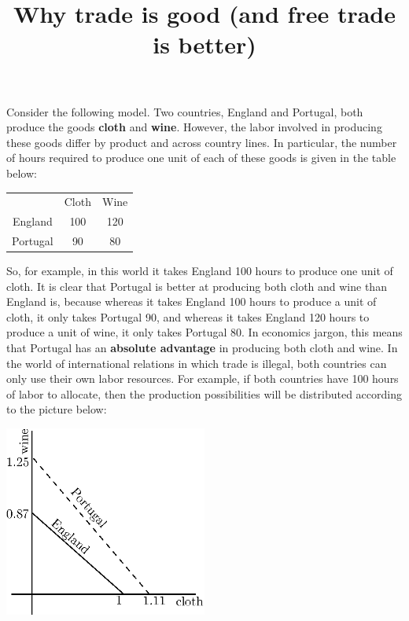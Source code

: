 \documentclass{article}
\title{Why trade is good (and free trade is better)}
\begin{document}
\maketitle

Consider the following model. Two countries, England and Portugal, both produce the goods
\textbf{cloth} and \textbf{wine}. However, the labor involved in producing these goods differ by
product and across country lines. In particular, the number of hours required to produce one unit of
each of these goods is given in the table below:

\begin{center}
  \begin{tabular}[]{ccc}
    & Cloth & Wine \\
    England & 100 & 120 \\
    Portugal & 90 & 80
  \end{tabular}
\end{center}

So, for example, in this world it takes England 100 hours to produce one unit of cloth. It is clear
that Portugal is better at producing both cloth and wine than England is, because whereas it takes
England 100 hours to produce a unit of cloth, it only takes Portugal 90, and whereas it takes
England 120 hours to produce a unit of wine, it only takes Portugal 80. In economics jargon, this
means that Portugal has an \textbf{absolute advantage} in producing both cloth and wine. In the
world of international relations in which trade is illegal, both countries can only use their own
labor resources. For example, if both countries have 100 hours of labor to allocate, then the
production possibilities will be distributed according to the picture below:

\begin{center}
  \includegraphics[width=0.5\textwidth]{../ipe-graphics/2018-11-21-comparative-advantage.eps}
\end{center}
\end{document}
